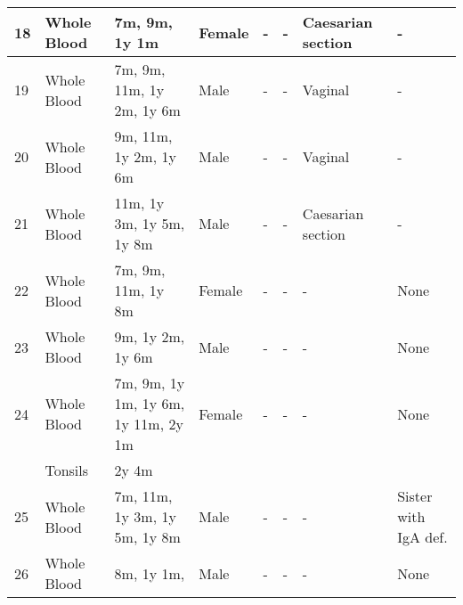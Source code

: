 \documentclass[12pt]{article}
\begin{document}
\begin{landscape}
\begin{longtable}[c]{|l | l |p{4cm}|l|l|l|l|l|}
					18 & Whole Blood & 7m, 9m, 1y 1m                                            & Female & -         & -          & Caesarian section & -                    \\ \hline
					19 & Whole Blood & 7m, 9m, 11m, 1y 2m, 1y 6m                                & Male   & -         & -          & Vaginal           & -                    \\ \hline
					20 & Whole Blood & 9m, 11m, 1y 2m, 1y 6m                                    & Male   & -         & -          & Vaginal           & -                    \\ \hline
					21 & Whole Blood & 11m, 1y 3m, 1y 5m, 1y 8m                                 & Male   & -         & -          & Caesarian section & -                    \\ \hline
					22 & Whole Blood & 7m, 9m, 11m, 1y 8m                                       & Female & -         & -          & -                 & None                 \\ \hline
					23 & Whole Blood & 9m, 1y 2m, 1y 6m                                         & Male   & -         & -          & -                 & None                 \\ \hline
					24 & Whole Blood & 7m, 9m, 1y 1m, 1y 6m, 1y 11m, 2y 1m                      & Female & -         & -          & -                 & None                 \\
					   & Tonsils     & 2y 4m                                                    &        &           &            &                   &  \\ \hline
					25 & Whole Blood & 7m, 11m, 1y 3m, 1y 5m, 1y 8m                             & Male   & -         & -          & -                 & Sister with IgA def. \\ \hline
					26 & Whole Blood & 8m, 1y 1m,                                               & Male   & -         & -          & -                 & None
				\end{longtable}
			\end{landscape}	
				
	
	
	
	
	
	
	
	
\end{document}

